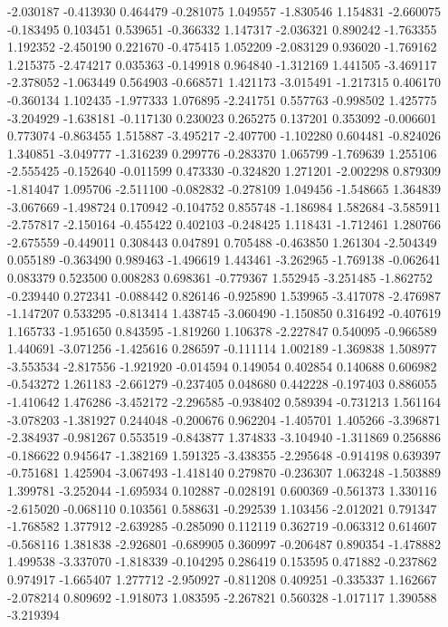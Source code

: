 -2.030187
-0.413930
0.464479
-0.281075
1.049557
-1.830546
1.154831
-2.660075
-0.183495
0.103451
0.539651
-0.366332
1.147317
-2.036321
0.890242
-1.763355
1.192352
-2.450190
0.221670
-0.475415
1.052209
-2.083129
0.936020
-1.769162
1.215375
-2.474217
0.035363
-0.149918
0.964840
-1.312169
1.441505
-3.469117
-2.378052
-1.063449
0.564903
-0.668571
1.421173
-3.015491
-1.217315
0.406170
-0.360134
1.102435
-1.977333
1.076895
-2.241751
0.557763
-0.998502
1.425775
-3.204929
-1.638181
-0.117130
0.230023
0.265275
0.137201
0.353092
-0.006601
0.773074
-0.863455
1.515887
-3.495217
-2.407700
-1.102280
0.604481
-0.824026
1.340851
-3.049777
-1.316239
0.299776
-0.283370
1.065799
-1.769639
1.255106
-2.555425
-0.152640
-0.011599
0.473330
-0.324820
1.271201
-2.002298
0.879309
-1.814047
1.095706
-2.511100
-0.082832
-0.278109
1.049456
-1.548665
1.364839
-3.067669
-1.498724
0.170942
-0.104752
0.855748
-1.186984
1.582684
-3.585911
-2.757817
-2.150164
-0.455422
0.402103
-0.248425
1.118431
-1.712461
1.280766
-2.675559
-0.449011
0.308443
0.047891
0.705488
-0.463850
1.261304
-2.504349
0.055189
-0.363490
0.989463
-1.496619
1.443461
-3.262965
-1.769138
-0.062641
0.083379
0.523500
0.008283
0.698361
-0.779367
1.552945
-3.251485
-1.862752
-0.239440
0.272341
-0.088442
0.826146
-0.925890
1.539965
-3.417078
-2.476987
-1.147207
0.533295
-0.813414
1.438745
-3.060490
-1.150850
0.316492
-0.407619
1.165733
-1.951650
0.843595
-1.819260
1.106378
-2.227847
0.540095
-0.966589
1.440691
-3.071256
-1.425616
0.286597
-0.111114
1.002189
-1.369838
1.508977
-3.553534
-2.817556
-1.921920
-0.014594
0.149054
0.402854
0.140688
0.606982
-0.543272
1.261183
-2.661279
-0.237405
0.048680
0.442228
-0.197403
0.886055
-1.410642
1.476286
-3.452172
-2.296585
-0.938402
0.589394
-0.731213
1.561164
-3.078203
-1.381927
0.244048
-0.200676
0.962204
-1.405701
1.405266
-3.396871
-2.384937
-0.981267
0.553519
-0.843877
1.374833
-3.104940
-1.311869
0.256886
-0.186622
0.945647
-1.382169
1.591325
-3.438355
-2.295648
-0.914198
0.639397
-0.751681
1.425904
-3.067493
-1.418140
0.279870
-0.236307
1.063248
-1.503889
1.399781
-3.252044
-1.695934
0.102887
-0.028191
0.600369
-0.561373
1.330116
-2.615020
-0.068110
0.103561
0.588631
-0.292539
1.103456
-2.012021
0.791347
-1.768582
1.377912
-2.639285
-0.285090
0.112119
0.362719
-0.063312
0.614607
-0.568116
1.381838
-2.926801
-0.689905
0.360997
-0.206487
0.890354
-1.478882
1.499538
-3.337070
-1.818339
-0.104295
0.286419
0.153595
0.471882
-0.237862
0.974917
-1.665407
1.277712
-2.950927
-0.811208
0.409251
-0.335337
1.162667
-2.078214
0.809692
-1.918073
1.083595
-2.267821
0.560328
-1.017117
1.390588
-3.219394
